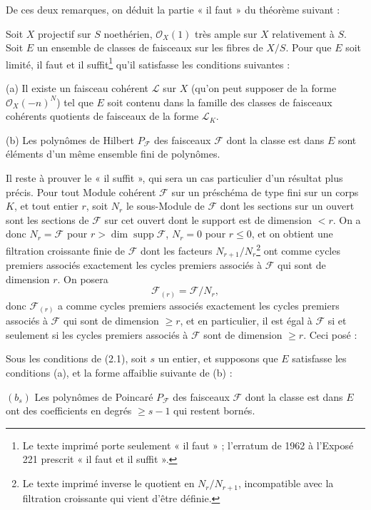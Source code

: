De ces deux remarques, on déduit la partie « il faut » du théorème suivant :

 Soit $X$ projectif sur $S$ noethérien,
$\mathcal O_X(1)$ très ample sur $X$ relativement à $S$. Soit $E$ un ensemble
de classes de faisceaux sur les fibres de $X/S$. Pour que $E$ soit limité, il
faut et il suffit\footnote{Le texte imprimé porte seulement « il faut » ;
l'erratum de 1962 à l'Exposé 221 prescrit « il faut et il suffit ».} qu'il
satisfasse les conditions suivantes :

\medskip
\noindent (a) Il existe un faisceau cohérent $\mathcal L$ sur $X$ (qu'on peut
supposer de la forme $\mathcal O_X(-n)^N$) tel que $E$ soit contenu dans la
famille des classes de faisceaux cohérents quotients de faisceaux de la forme
$\mathcal L_K$.

\smallskip
\noindent (b) Les polynômes de Hilbert $P_{\mathcal F}$ des faisceaux
$\mathcal F$ dont la classe est dans $E$ sont éléments d'un même ensemble fini
de polynômes.

Il reste à prouver le « il suffit », qui sera un cas particulier d'un résultat
plus précis. Pour tout Module cohérent $\mathcal F$ sur un préschéma de type
fini sur un corps $K$, et tout entier $r$, soit $N_r$ le sous-Module de
$\mathcal F$ dont les sections sur un ouvert sont les sections de $\mathcal F$
sur cet ouvert dont le support est de dimension $<r$. On a donc
$N_r=\mathcal F$ pour $r>\dim\operatorname{supp}\mathcal F$, $N_r=0$ pour
$r\leq0$, et on obtient une filtration croissante finie de $\mathcal F$ dont
les facteurs $N_{r+1}/N_r$\footnote{Le texte imprimé inverse le quotient en
$N_r/N_{r+1}$, incompatible avec la filtration croissante qui vient d'être
définie.} ont comme cycles premiers associés exactement les cycles premiers
associés à $\mathcal F$ qui sont de dimension $r$. On posera
\[
\mathcal F_{(r)}=\mathcal F/N_r,
\]
donc $\mathcal F_{(r)}$ a comme cycles premiers associés exactement les cycles
premiers associés à $\mathcal F$ qui sont de dimension $\geq r$, et en
particulier, il est égal à $\mathcal F$ si et seulement si les cycles premiers
associés à $\mathcal F$ sont de dimension $\geq r$. Ceci posé :

 Sous les conditions de (2.1), soit $s$ un entier, et
supposons que $E$ satisfasse les conditions (a), et la forme affaiblie suivante
de (b) :

\medskip
\noindent $(b_s)$ Les polynômes de Poincaré $P_{\mathcal F}$ des faisceaux
$\mathcal F$ dont la classe est dans $E$ ont des coefficients en degrés
$\geq s-1$ qui restent bornés.

